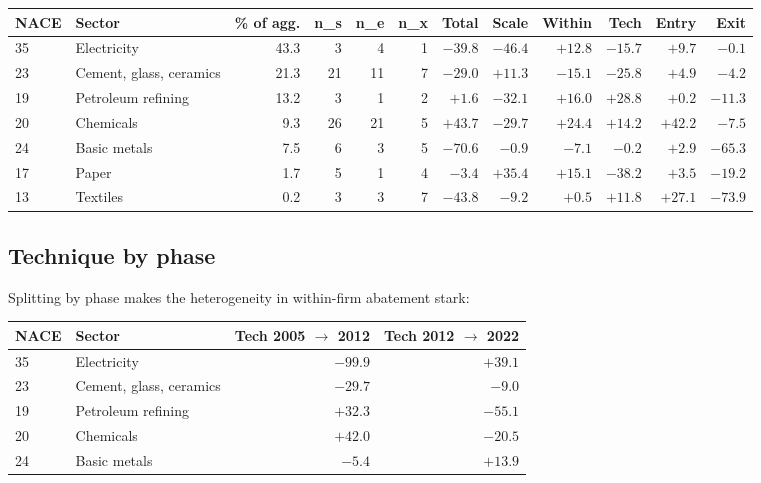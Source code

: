 \documentclass[11pt]{article}
\begin{document}
\begin{center}
\small
\begin{tabular}{llrrrrrrrrrr}
\toprule
NACE & Sector & \% of agg. & n\_s & n\_e & n\_x & Total & Scale & Within & Tech & Entry & Exit \\
\midrule
35 & Electricity               & 43.3 &  3 &  4 &  1 & $\mathbf{-39.8}$ & $-46.4$ & $+12.8$           & $-15.7$          & $+9.7$  & $-0.1$  \\
23 & Cement, glass, ceramics   & 21.3 & 21 & 11 &  7 & $\mathbf{-29.0}$ & $+11.3$ & $\mathbf{-15.1}$  & $\mathbf{-25.8}$ & $+4.9$  & $-4.2$  \\
19 & Petroleum refining        & 13.2 &  3 &  1 &  2 & $+1.6$           & $-32.1$ & $+16.0$           & $+28.8$          & $+0.2$  & $-11.3$ \\
20 & Chemicals                 &  9.3 & 26 & 21 &  5 & $\mathbf{+43.7}$ & $-29.7$ & $+24.4$           & $+14.2$          & $+42.2$ & $-7.5$  \\
24 & Basic metals              &  7.5 &  6 &  3 &  5 & $\mathbf{-70.6}$ & $-0.9$  & $-7.1$            & $-0.2$           & $+2.9$  & $-65.3$ \\
17 & Paper                     &  1.7 &  5 &  1 &  4 & $-3.4$           & $+35.4$ & $+15.1$           & $-38.2$          & $+3.5$  & $-19.2$ \\
13 & Textiles                  &  0.2 &  3 &  3 &  7 & $-43.8$          & $-9.2$  & $+0.5$            & $+11.8$          & $+27.1$ & $-73.9$ \\
\bottomrule
\end{tabular}
\end{center}

\subsection{Technique by phase}

Splitting by phase makes the heterogeneity in within-firm abatement stark:

\begin{center}
\begin{tabular}{llrr}
\toprule
NACE & Sector & Tech 2005 $\to$ 2012 & Tech 2012 $\to$ 2022 \\
\midrule
35 & Electricity               & $\mathbf{-99.9}$ & $\mathbf{+39.1}$ \\
23 & Cement, glass, ceramics   & $-29.7$          & $-9.0$           \\
19 & Petroleum refining        & $+32.3$          & $-55.1$          \\
20 & Chemicals                 & $+42.0$          & $-20.5$          \\
24 & Basic metals              & $-5.4$           & $+13.9$          \\
\bottomrule
\end{tabular}
\end{center}
\end{document}
